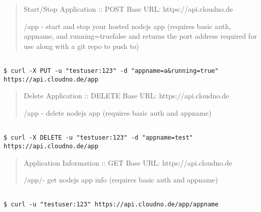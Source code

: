 \begin{quote}

Start\slash Stop Application :: POST
Base URL: https:/\slash api.cloudno.de

\slash app - start and stop your hosted nodejs app (requires basic auth, appname, and running=true\textbar{}false and returns the port address required for use along with a git repo to push to)
\end{quote}

\begin{adjustwidth}{2.5em}{2.5em}
\begin{verbatim}

$ curl -X PUT -u "testuser:123" -d "appname=a&running=true" https://api.cloudno.de/app

\end{verbatim}
\end{adjustwidth}

\begin{quote}

Delete Application :: DELETE
Base URL: https:/\slash api.cloudno.de

\slash app - delete nodejs app (requires basic auth and appname)
\end{quote}

\begin{adjustwidth}{2.5em}{2.5em}
\begin{verbatim}

$ curl -X DELETE -u "testuser:123" -d "appname=test" https://api.cloudno.de/app

\end{verbatim}
\end{adjustwidth}

\begin{quote}

Application Information :: GET
Base URL: https:/\slash api.cloudno.de

\slash app\slash  - get nodejs app info (requires basic auth and appname)
\end{quote}

\begin{adjustwidth}{2.5em}{2.5em}
\begin{verbatim}

$ curl -u "testuser:123" https://api.cloudno.de/app/appname

\end{verbatim}
\end{adjustwidth}



